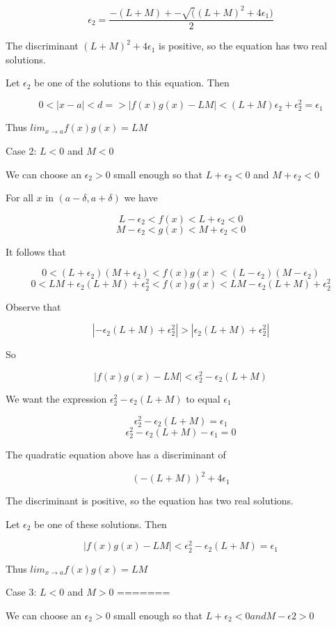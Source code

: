     $$ \epsilon_2 = \frac{-(L + M) +- \sqrt((L + M)^2 + 4\epsilon_1)}{2} $$

The discriminant $(L + M)^2 + 4\epsilon_1$ is positive, so the equation has two real solutions.

Let $\epsilon_2$ be one of the solutions to this equation. Then

    $$ 0 < |x - a| < d => |f(x)g(x) - LM| < (L + M)\epsilon_2 + \epsilon_2^2 = \epsilon_1 $$

Thus $lim_{x \rightarrow a} f(x)g(x) = LM$

Case 2: $L < 0$ and $M < 0$

We can choose an $\epsilon_2 > 0$ small enough so that $L + \epsilon_2 < 0$ and $M + \epsilon_2 < 0$

For all $x$ in $(a - \delta, a + \delta)$ we have

    $$ L - \epsilon_2 < f(x) < L + \epsilon_2 < 0 $$ 
    $$ M - \epsilon_2 < g(x) < M + \epsilon_2 < 0 $$
 
It follows that

    $$ 0 < (L + \epsilon_2)(M + \epsilon_2) < f(x)g(x) < (L - \epsilon_2)(M - \epsilon_2) $$
    $$ 0 < LM + \epsilon_2(L + M) + \epsilon_2^2 < f(x)g(x) < LM - \epsilon_2(L + M) + \epsilon_2^2 $$

Observe that

    $$ |-\epsilon_2(L + M) + \epsilon_2^2| > |\epsilon_2(L + M) + \epsilon_2^2| $$

So

    $$ |f(x)g(x) - LM| < \epsilon_2^2 - \epsilon_2(L + M) $$

We want the expression $\epsilon_2^2 - \epsilon_2(L + M)$ to equal $\epsilon_1$

    $$ \epsilon_2^2 - \epsilon_2(L + M) = \epsilon_1 $$
    $$ \epsilon_2^2 - \epsilon_2(L + M) - \epsilon_1 = 0 $$

The quadratic equation above has a discriminant of

    $$ (-(L + M))^2 + 4\epsilon_1 $$

The discriminant is positive, so the equation has two real solutions.

Let $\epsilon_2$ be one of these solutions. Then

    $$ |f(x)g(x) - LM| < \epsilon_2^2 - \epsilon_2(L + M) = \epsilon_1 $$

Thus $lim_{x \rightarrow a} f(x)g(x) = LM$

Case 3: $L < 0$ and $M > 0$
=======

We can choose an $\epsilon_2 > 0$ small enough so that $L + \epsilon_2 < 0 and M - \epsilon2 > 0$

